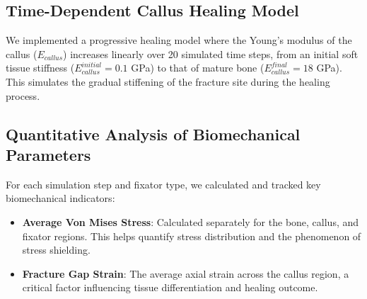 \documentclass{article}
\begin{document}
\subsection{Time-Dependent Callus Healing Model}
We implemented a progressive healing model where the Young's modulus of the callus ($E_{callus}$) increases linearly over 20 simulated time steps, from an initial soft tissue stiffness ($E_{callus}^{initial} = 0.1$ GPa) to that of mature bone ($E_{callus}^{final} = 18$ GPa). This simulates the gradual stiffening of the fracture site during the healing process.

\subsection{Quantitative Analysis of Biomechanical Parameters}
For each simulation step and fixator type, we calculated and tracked key biomechanical indicators:
\begin{itemize}
  \item \textbf{Average Von Mises Stress}: Calculated separately for the bone, callus, and fixator regions. This helps quantify stress distribution and the phenomenon of stress shielding.
  \item \textbf{Fracture Gap Strain}: The average axial strain across the callus region, a critical factor influencing tissue differentiation and healing outcome.
\end{itemize}
\end{document}
